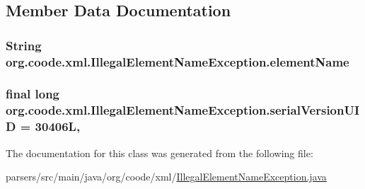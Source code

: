 \subsection{Member Data Documentation}
\hypertarget{classorg_1_1coode_1_1xml_1_1_illegal_element_name_exception_a2864fd5f4b611a538e80dbfdfaa6d930}{
\subsubsection[{element\-Name}]{\setlength{\rightskip}{0pt plus 5cm}String org.\-coode.\-xml.\-Illegal\-Element\-Name\-Exception.\-element\-Name\hspace{0.3cm}{\ttfamily [private]}}}\label{classorg_1_1coode_1_1xml_1_1_illegal_element_name_exception_a2864fd5f4b611a538e80dbfdfaa6d930}
\hypertarget{classorg_1_1coode_1_1xml_1_1_illegal_element_name_exception_a36225ca0e0bbc64f8f9184a3b9c89dd4}{
\subsubsection[{serial\-Version\-U\-I\-D}]{\setlength{\rightskip}{0pt plus 5cm}final long org.\-coode.\-xml.\-Illegal\-Element\-Name\-Exception.\-serial\-Version\-U\-I\-D = 30406\-L\hspace{0.3cm}{\ttfamily [static]}, {\ttfamily [private]}}}\label{classorg_1_1coode_1_1xml_1_1_illegal_element_name_exception_a36225ca0e0bbc64f8f9184a3b9c89dd4}


The documentation for this class was generated from the following file\-:\begin{DoxyCompactItemize}
\item 
parsers/src/main/java/org/coode/xml/\hyperlink{_illegal_element_name_exception_8java}{Illegal\-Element\-Name\-Exception.\-java}\end{DoxyCompactItemize}
